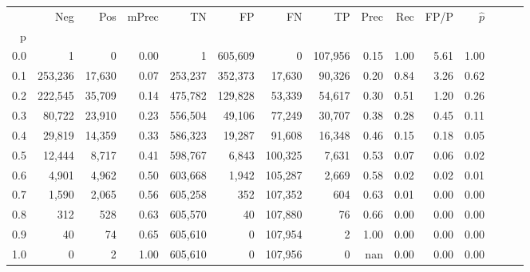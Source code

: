 \begin{tabular}{rrrrrrrrrrrrrrr}
\toprule
{} &      Neg &     Pos & mPrec &       TN &       FP &       FN &       TP &  Prec &   Rec &  FP/P & $\hat{p}$ \\
p   &          &         &       &          &          &          &          &       &       &       &           \\
\midrule
0.0 &        1 &       0 &  0.00 &        1 &  605,609 &        0 &  107,956 &  0.15 &  1.00 &  5.61 &      1.00 \\
0.1 &  253,236 &  17,630 &  0.07 &  253,237 &  352,373 &   17,630 &   90,326 &  0.20 &  0.84 &  3.26 &      0.62 \\
0.2 &  222,545 &  35,709 &  0.14 &  475,782 &  129,828 &   53,339 &   54,617 &  0.30 &  0.51 &  1.20 &      0.26 \\
0.3 &   80,722 &  23,910 &  0.23 &  556,504 &   49,106 &   77,249 &   30,707 &  0.38 &  0.28 &  0.45 &      0.11 \\
0.4 &   29,819 &  14,359 &  0.33 &  586,323 &   19,287 &   91,608 &   16,348 &  0.46 &  0.15 &  0.18 &      0.05 \\
0.5 &   12,444 &   8,717 &  0.41 &  598,767 &    6,843 &  100,325 &    7,631 &  0.53 &  0.07 &  0.06 &      0.02 \\
0.6 &    4,901 &   4,962 &  0.50 &  603,668 &    1,942 &  105,287 &    2,669 &  0.58 &  0.02 &  0.02 &      0.01 \\
0.7 &    1,590 &   2,065 &  0.56 &  605,258 &      352 &  107,352 &      604 &  0.63 &  0.01 &  0.00 &      0.00 \\
0.8 &      312 &     528 &  0.63 &  605,570 &       40 &  107,880 &       76 &  0.66 &  0.00 &  0.00 &      0.00 \\
0.9 &       40 &      74 &  0.65 &  605,610 &        0 &  107,954 &        2 &  1.00 &  0.00 &  0.00 &      0.00 \\
1.0 &        0 &       2 &  1.00 &  605,610 &        0 &  107,956 &        0 &   nan &  0.00 &  0.00 &      0.00 \\
\bottomrule
\end{tabular}
